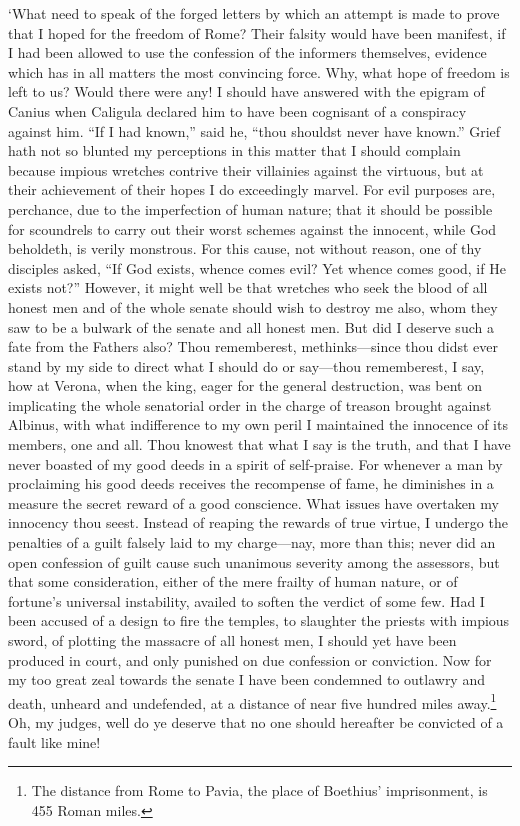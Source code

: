 \documentclass[11pt]{book}
\begin{document}
`What need to speak of the forged letters by which an attempt is     
made to prove that I hoped for the freedom of Rome? Their falsity       
would have been manifest, if I had been allowed to use the confession   
of the informers themselves, evidence which has in all matters the      
most convincing force. Why, what hope of freedom is left to us? Would   
there were any! I should have answered with the epigram of Canius when  
Caligula declared him to have been cognisant of a conspiracy against    
him. ``If I had known,'' said he, ``thou shouldst never have known.''       
Grief hath not so blunted my perceptions in this matter that I should   
complain because impious wretches contrive their villainies against     
the virtuous, but at their achievement of their hopes I do exceedingly  
marvel. For evil purposes are, perchance, due to the imperfection       
of human nature; that it should be possible for scoundrels to carry     
out their worst schemes against the innocent, while God beholdeth,      
is verily monstrous. For this cause, not without reason, one of thy     
disciples asked, ``If God exists, whence comes evil? Yet whence comes    
good, if He exists not?'' However, it might well be that wretches who    
seek the blood of all honest men and of the whole senate should wish    
to destroy me also, whom they saw to be a bulwark of the senate and     
all honest men. But did I deserve such a fate from the Fathers also?    
Thou rememberest, methinks---since thou didst ever stand by my side      
to direct what I should do or say---thou rememberest, I say, how at      
Verona, when the king, eager for the general destruction, was bent on   
implicating the whole senatorial order in the charge of treason brought 
against Albinus, with what indifference to my own peril I maintained    
the innocence of its members, one and all. Thou knowest that what I     
say is the truth, and that I have never boasted of my good deeds in     
a spirit of self-praise. For whenever a man by proclaiming his good     
deeds receives the recompense of fame, he diminishes in a measure the   
secret reward of a good conscience. What issues have overtaken my       
innocency thou seest. Instead of reaping the rewards of true virtue,    
I undergo the penalties of a guilt falsely laid to my charge---nay,      
more than this; never did an open confession of guilt cause such        
unanimous severity among the assessors, but that some consideration,    
either of the mere frailty of human nature, or of fortune's universal   
instability, availed to soft\-en the verdict of some few. Had I been      
accused of a design to fire the temples, to slaughter the priests with  
impious sword, of plotting the massacre of all honest men, I should yet 
have been produced in court, and only punished on due confession or     
conviction. Now for my too great zeal towards the senate I have been    
condemned to outlawry and death, unheard and undefended, at a distance  
of near five hundred miles away.\footnote{The distance from Rome to     
Pavia, the place of Boethius' imprisonment, is 455 Roman miles.} Oh, my 
judges, well do ye deserve that no one should hereafter be convicted of 
a fault like mine!                                                      
\end{document}
